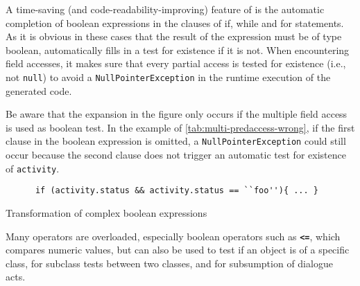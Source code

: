 
A time-saving (and code-readability-improving) feature of \vonda is the
automatic completion of boolean expressions in the clauses of if, while and for
statements. As it is obvious in these cases that the result of the expression
must be of type boolean, \vonda automatically fills in a test for existence if
it is not. When encountering field accesses, it makes sure that every
partial access is tested for existence (i.e., not \texttt{null}) to avoid a
\texttt{NullPointerException} in the runtime execution of the generated code.

Be aware that the expansion in the figure only occurs if the multiple field
access is used as boolean test. In the example of
\ref{tab:multi-predaccess-wrong}, if the first clause in the boolean expression
is omitted, a \texttt{NullPointerException} could still occur because the second clause does not trigger an automatic test for existence of \texttt{activity}.

\begin{table}[htbp]
  \centering
  \begin{small}
    \begin{lstlisting}
      if (activity.status && activity.status == ``foo''){ ... }
    \end{lstlisting}
  \end{small}

\caption{Transformation of complex boolean expressions}
\label{tab:multi-predaccess-wrong}
\end{table}
\vspace*{10pt}


Many operators are overloaded, especially boolean operators such as
\textbf{\texttt{<=}}, which compares numeric values, but can also be used to test if an
object is of a specific class, for subclass tests between two classes, and for
subsumption of dialogue acts.

